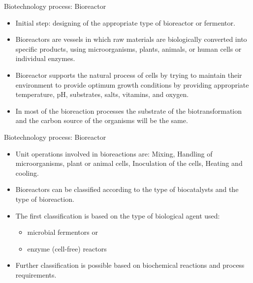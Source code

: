 \documentclass[ignorenonframetext,aspectratio=169]{beamer}
\providecommand{\tightlist}{%
  \setlength{\itemsep}{0pt}\setlength{\parskip}{0pt}}
\begin{document}
\begin{frame}{Biotechnology process: Bioreactor}
\protect\hypertarget{biotechnology-process-bioreactor}{}

\begin{itemize}
\tightlist
\item
  Initial step: designing of the appropriate type of bioreactor or
  fermentor.
\item
  Bioreactors are vessels in which raw materials are biologically
  converted into specific products, using microorganisms, plants,
  animals, or human cells or individual enzymes.
\item
  Bioreactor supports the natural process of cells by trying to maintain
  their environment to provide optimum growth conditions by providing
  appropriate temperature, pH, substrates, salts, vitamins, and oxygen.
\item
  In most of the bioreaction processes the substrate of the
  biotransformation and the carbon source of the organisms will be the
  same.
\end{itemize}

\end{frame}

\begin{frame}{Biotechnology process: Bioreactor}
\protect\hypertarget{biotechnology-process-bioreactor-1}{}

\begin{itemize}
\tightlist
\item
  Unit operations involved in bioreactions are: Mixing, Handling of
  microorganisms, plant or animal cells, Inoculation of the cells,
  Heating and cooling.
\item
  Bioreactors can be classified according to the type of biocatalysts
  and the type of bioreaction.
\item
  The first classification is based on the type of biological agent
  used:

  \begin{itemize}
  \tightlist
  \item
    microbial fermentors or
  \item
    enzyme (cell-free) reactors
  \end{itemize}
\item
  Further classification is possible based on biochemical reactions and
  process requirements.
\end{itemize}

\end{frame}
\end{document}
